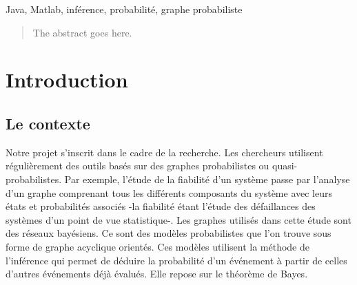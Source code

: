 \documentclass[conference]{IEEEtran}
\begin{document}




\maketitle



\begin{center}
Java, Matlab, inférence, probabilité, graphe probabiliste
\end{center}

\begin{abstract}
The abstract goes here.

\cite{murphyk}
\end{abstract}





%
\IEEEpeerreviewmaketitle



\section{Introduction}

\subsection{Le contexte}
Notre projet s'inscrit dans le cadre de la recherche. Les chercheurs utilisent régulièrement des outils basés sur des graphes probabilistes ou quasi-probabilistes.
Par exemple, l'étude de la fiabilité d'un système passe par l'analyse d'un graphe comprenant tous les différents composants du système avec leurs états et probabilités associés -la fiabilité étant l'étude des défaillances des systèmes d'un point de vue statistique-. Les graphes utilisés dans cette étude sont des réseaux bayésiens. Ce sont des modèles probabilistes que l'on trouve sous forme de graphe acyclique orientés. Ces modèles utilisent la méthode de l'inférence qui permet de déduire la probabilité d'un événement à partir de celles d'autres événements déjà évalués. Elle repose sur le théorème de Bayes.
\end{document}

